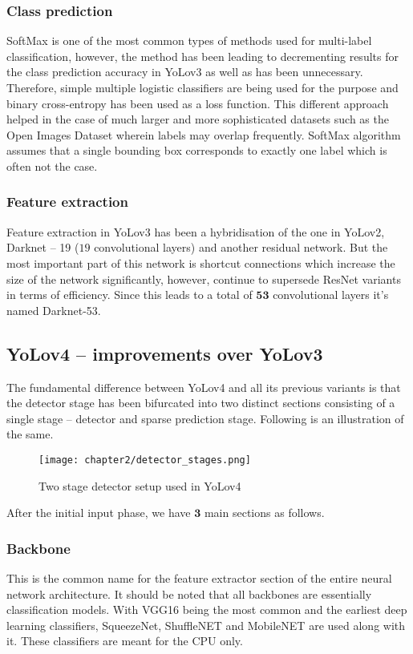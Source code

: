 \subsubsection{Class prediction}
SoftMax is one of the most common types of methods used for multi-label classification, however, the method has been leading to decrementing results for the class prediction accuracy in YoLov3 as well as has been unnecessary. Therefore, simple multiple logistic classifiers are being used for the purpose and binary cross-entropy has been used as a loss function. This different approach helped in the case of much larger and more sophisticated datasets such as the Open Images Dataset wherein labels may overlap frequently. SoftMax algorithm assumes that a single bounding box corresponds to exactly one label which is often not the case.

\subsubsection{Feature extraction}
Feature extraction in YoLov3 has been a hybridisation of the one in YoLov2, Darknet – 19 ($19$ convolutional layers) and another residual network. But the most important part of this network is shortcut connections which increase the size of the network significantly, however, continue to supersede ResNet variants in terms of efficiency. Since this leads to a total of $\boldsymbol{53}$ convolutional layers it's named Darknet-53.


\subsection{YoLov4 – improvements over YoLov3}

The fundamental difference between YoLov4 and all its previous variants is that the detector stage has been bifurcated into two distinct sections consisting of a single stage – detector and sparse prediction stage. Following is an illustration of the same.

\begin{figure}[h]
  \centering
  \texttt{[image: chapter2/detector\_stages.png]}
  \caption{Two stage detector setup used in YoLov4}
  \label{fig:detector}
\end{figure}

After the initial input phase, we have $\boldsymbol{3}$ main sections as follows.

\subsubsection{Backbone}
This is the common name for the feature extractor section of the entire neural network architecture. It should be noted that all backbones are essentially classification models. With VGG16 being the most common and the earliest deep learning classifiers, SqueezeNet, ShuffleNET and MobileNET are used along with it. These classifiers are meant for the CPU only.

